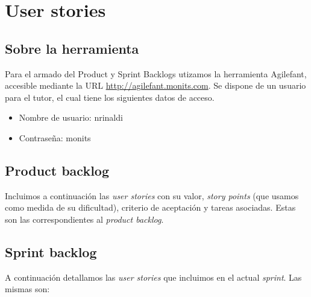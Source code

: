 \documentclass[10pt, a4paper,english,spanish]{article}
\begin{document}

\maketitle
\pagebreak

\tableofcontents
\pagebreak

\section{User stories}

\subsection{Sobre la herramienta}

Para el armado del Product y Sprint Backlogs utizamos la herramienta Agilefant,
accesible mediante la URL \url{http://agilefant.monits.com}. Se
dispone de un usuario para el tutor, el cual tiene los siguientes datos de acceso.

\begin{itemize}
	\item Nombre de usuario: nrinaldi
	\item Contrase\~na: monits
\end{itemize}

\subsection{Product backlog}

Incluimos a continuaci\'on las \textit{user stories} con su valor, \textit{story points} (que usamos
como medida de su dificultad), criterio de aceptaci\'on y tareas asociadas. Estas son las 
correspondientes al \textit{product backlog}.



\subsection{Sprint backlog}

A continuaci\'on detallamos las \textit{user stories} que incluimos en el actual \textit{sprint}. Las mismas son:
\end{document}
